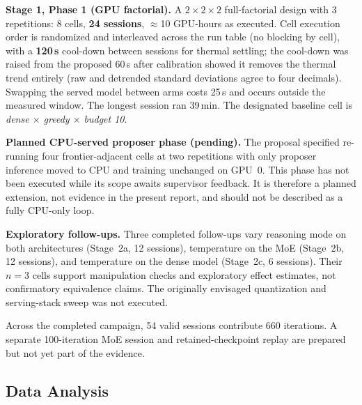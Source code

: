 \textbf{Stage 1, Phase 1 (GPU factorial).} A $2 \times 2 \times 2$ full-factorial design with 3 repetitions: 8 cells, \textbf{24 sessions}, $\approx$10 GPU-hours as executed. Cell execution order is randomized and interleaved across the run table (no blocking by cell), with a \textbf{120\,s} cool-down between sessions for thermal settling; the cool-down was raised from the proposed 60\,s after calibration showed it removes the thermal trend entirely (raw and detrended standard deviations agree to four decimals). Swapping the served model between arms costs 25\,s and occurs outside the measured window. The longest session ran 39\,min. The designated baseline cell is \emph{dense $\times$ greedy $\times$ budget 10}.

\textbf{Planned CPU-served proposer phase (pending).} The proposal specified re-running four frontier-adjacent cells at two repetitions with only proposer inference moved to CPU and training unchanged on GPU~0. This phase has not been executed while its scope awaits supervisor feedback. It is therefore a planned extension, not evidence in the present report, and should not be described as a fully CPU-only loop.

\textbf{Exploratory follow-ups.} Three completed follow-ups vary reasoning mode on both architectures (Stage~2a, 12 sessions), temperature on the MoE (Stage~2b, 12 sessions), and temperature on the dense model (Stage~2c, 6 sessions). Their $n=3$ cells support manipulation checks and exploratory effect estimates, not confirmatory equivalence claims. The originally envisaged quantization and serving-stack sweep was not executed.

Across the completed campaign, 54 valid sessions contribute 660 iterations. A separate 100-iteration MoE session and retained-checkpoint replay are prepared but not yet part of the evidence.

\subsection{Data Analysis}

